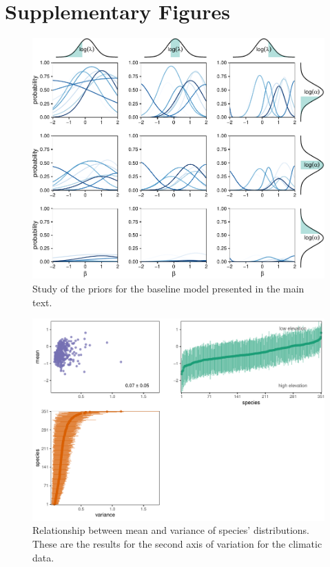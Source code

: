 \documentclass[11pt, a4paper]{article}
\begin{document}
\section*{Supplementary Figures}

\begin{figure}[ht]
  \centering
    \vspace{0.5cm}
    \includegraphics[width=1\textwidth]{figures/prior}
    	  \vspace{0.3cm}
	   \caption{Study of the priors for the baseline model presented in the main text.}
      \label{sfig:sensitivity}
\end{figure}

\clearpage

\begin{figure}[h]
  \centering
    \vspace{0.5cm}
    \includegraphics[width=1\textwidth]{figures/figure1-secondaxis}
    	  \vspace{0.3cm}
	   \caption{Relationship between mean and variance of species' distributions. These are the results for the second axis of variation for the climatic data.}
      \label{sfig:sensitivity}
\end{figure}

\clearpage


\end{document}

